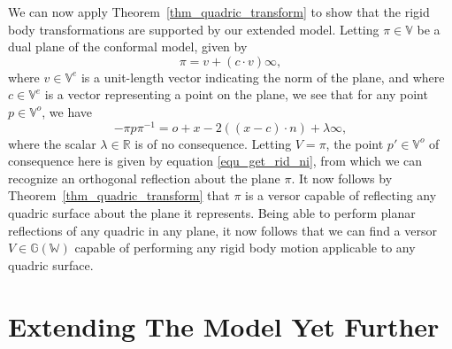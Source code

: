 \documentclass{birkjour}
\theoremstyle{definition}
\theoremstyle{remark}
\numberwithin{equation}{section}
\newcommand{\G}{\mathbb{G}}
\newcommand{\V}{\mathbb{V}}
\newcommand{\W}{\mathbb{W}}
\newcommand{\R}{\mathbb{R}}
\newcommand{\nvao}{o}
\newcommand{\nvai}{\infty}
\begin{document}
We can now apply Theorem~\ref{thm_quadric_transform} to show
that the rigid body transformations are supported by our extended model.
Letting $\pi\in\V$ be a dual plane of the conformal model, given by
\begin{equation}
\pi = v+(c\cdot v)\nvai,
\end{equation}
where $v\in\V^e$ is a unit-length vector indicating the norm of the plane,
and where $c\in\V^e$ is a vector representing a point on the plane,
we see that for any point $p\in\V^o$, we have
\begin{equation}
-\pi p\pi^{-1} = \nvao+x-2((x-c)\cdot n) + \lambda\nvai,
\end{equation}
where the scalar $\lambda\in\R$ is of no consequence.  Letting $V=\pi$,
the point $p'\in\V^o$ of consequence here is given by equation \eqref{equ_get_rid_ni},
from which we can recognize an orthogonal reflection about the plane $\pi$.
It now follows by Theorem~\ref{thm_quadric_transform} that $\pi$ is a versor
capable of reflecting any quadric surface about the plane it represents.
Being able to perform planar reflections of any quadric in any plane, it
now follows that we can find a versor $V\in\G(\W)$ capable of performing
any rigid body motion applicable to any quadric surface.


\section{Extending The Model Yet Further}
\end{document}

